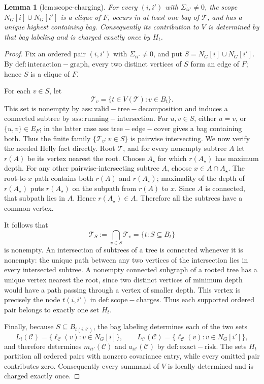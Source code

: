 \documentclass{article}
\newtheorem{lemma}{Lemma}
\begin{document}
\begin{lemma}[lem:scope-charging]\label{lem:scope-charging}
For every \((i,i')\) with \(\Sigma_{ii'}\ne0\), the scope \(N_G[i]\cup N_G[i']\) is a clique of \(F\), occurs in at least one bag of \(\mathcal T\), and has a unique highest containing bag. Consequently its contribution to \(V\) is determined by that bag labeling and is charged exactly once by \(H_t\).
\end{lemma}
\begin{proof}
Fix an ordered pair \((i,i')\) with \(\Sigma_{ii'}\ne0\), and put \(S=N_G[i]\cup N_G[i']\).  By \(\mathrm{def:interaction-graph}\), every two distinct vertices of \(S\) form an edge of \(F\); hence \(S\) is a clique of \(F\).

For each \(v\in S\), let
\[
  \mathcal T_v=\{t\in V(\mathcal T):v\in B_t\}.
\]
This set is nonempty by \(\mathrm{ass:valid-tree-decomposition}\) and induces a connected subtree by \(\mathrm{ass:running-intersection}\).  For \(u,v\in S\), either \(u=v\), or \(\{u,v\}\in E_F\); in the latter case \(\mathrm{ass:tree-edge-cover}\) gives a bag containing both.  Thus the finite family \(\{\mathcal T_v:v\in S\}\) is pairwise intersecting.  We now verify the needed Helly fact directly.  Root \(\mathcal T\), and for every nonempty subtree \(A\) let \(r(A)\) be its vertex nearest the root.  Choose \(A_\star\) for which \(r(A_\star)\) has maximum depth.  For any other pairwise-intersecting subtree \(A\), choose \(x\in A\cap A_\star\).  The root-to-\(x\) path contains both \(r(A)\) and \(r(A_\star)\); maximality of the depth of \(r(A_\star)\) puts \(r(A_\star)\) on the subpath from \(r(A)\) to \(x\).  Since \(A\) is connected, that subpath lies in \(A\).  Hence \(r(A_\star)\in A\).  Therefore all the subtrees have a common vertex.

It follows that
\[
  \mathcal T_S:=\bigcap_{v\in S}\mathcal T_v
  =\{t:S\subseteq B_t\}
\]
is nonempty.  An intersection of subtrees of a tree is connected whenever it is nonempty: the unique path between any two vertices of the intersection lies in every intersected subtree.  A nonempty connected subgraph of a rooted tree has a unique vertex nearest the root, since two distinct vertices of minimum depth would have a path passing through a vertex of smaller depth.  This vertex is precisely the node \(t(i,i')\) in \(\mathrm{def:scope-charges}\).  Thus each supported ordered pair belongs to exactly one set \(H_t\).

Finally, because \(S\subseteq B_{t(i,i')}\), the bag labeling determines each of the two sets
\[
  L_i(\mathcal C)=\{\ell_{\mathcal C}(v):v\in N_G[i]\},\qquad
  L_{i'}(\mathcal C)=\{\ell_{\mathcal C}(v):v\in N_G[i']\},
\]
and therefore determines \(m_{ii'}(\mathcal C)\) and \(a_{ii'}(\mathcal C)\) by \(\mathrm{def:exact-risk}\).  The sets \(H_t\) partition all ordered pairs with nonzero covariance entry, while every omitted pair contributes zero.  Consequently every summand of \(V\) is locally determined and is charged exactly once.
\end{proof}
\end{document}
